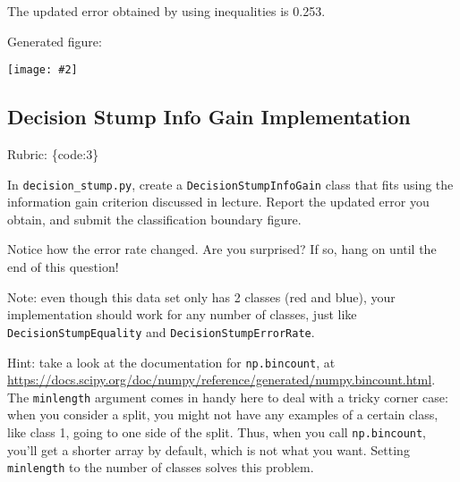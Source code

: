 \documentclass{article}
\def\rubric#1{\gre{Rubric: \{#1\}}}{}
\def\blu#1{{\color{blu}#1}}
\def\gre#1{{\color{gre}#1}}
\newcommand{\centerfig}[2]{\begin{center}\texttt{[image: \#2]}\end{center}}
\begin{document}
\gre{The updated error obtained by using inequalities is 0.253.}

\gre{Generated figure:}
\centerfig{0.7}{../figs/q6_2_decisionBoundary}

\subsection{Decision Stump Info Gain Implementation}
\rubric{code:3}

In \texttt{decision\string_stump.py}, \blu{create a \texttt{DecisionStumpInfoGain} class that 
fits using the information gain criterion discussed in lecture. Report the updated error you obtain, and submit the classification boundary figure.}

Notice how the error rate changed. Are you surprised? If so, hang on until the end of this question!

Note: even though this data set only has 2 classes (red and blue), your implementation should work 
for any number of classes, just like \texttt{DecisionStumpEquality} and \texttt{DecisionStumpErrorRate}.

Hint: take a look at the documentation for \texttt{np.bincount}, at \\
\url{https://docs.scipy.org/doc/numpy/reference/generated/numpy.bincount.html}. 
The \texttt{minlength} argument comes in handy here to deal with a tricky corner case:
when you consider a split, you might not have any examples of a certain class, like class 1,
going to one side of the split. Thus, when you call \texttt{np.bincount}, you'll get
a shorter array by default, which is not what you want. Setting \texttt{minlength} to the 
number of classes solves this problem.
\end{document}
